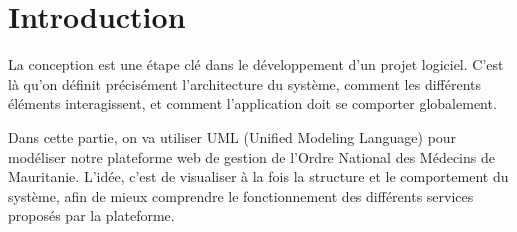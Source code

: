 ﻿\documentclass[12pt,a4paper]{report}
\begin{document}
\section{Introduction}

La conception est une étape clé dans le développement d’un projet
logiciel. C’est là qu’on définit précisément l’architecture du
système, comment les différents éléments interagissent, et comment
l’application doit se comporter globalement.

Dans cette partie, on va utiliser UML (Unified Modeling Language)
pour modéliser notre plateforme web de gestion de l’Ordre National
des Médecins de Mauritanie. L’idée, c’est de visualiser à la fois
la structure et le comportement du système, afin de mieux comprendre
le fonctionnement des différents services proposés par la plateforme.







\end{document}
